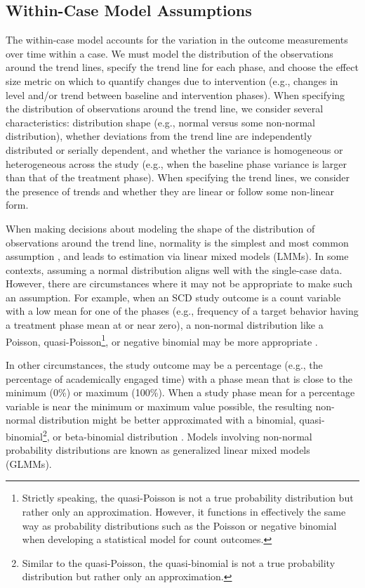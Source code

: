 \documentclass[
]{book}
\begin{document}
\hypertarget{within-case-model-assumptions}{%
\subsection{Within-Case Model Assumptions}\label{within-case-model-assumptions}}

The within-case model accounts for the variation in the outcome measurements over time within a case.
We must model the distribution of the observations around the trend lines, specify the trend line for each phase, and choose the effect size metric on which to quantify changes due to intervention (e.g., changes in level and/or trend between baseline and intervention phases).
When specifying the distribution of observations around the trend line, we consider several characteristics: distribution shape (e.g., normal versus some non-normal distribution), whether deviations from the trend line are independently distributed or serially dependent, and whether the variance is homogeneous or heterogeneous across the study (e.g., when the baseline phase variance is larger than that of the treatment phase).
When specifying the trend lines, we consider the presence of trends and whether they are linear or follow some non-linear form.

When making decisions about modeling the shape of the distribution of observations around the trend line, normality is the simplest and most common assumption \citep[e.g.,][]{Declercq2019, Moeyaert_Ferron_Beretvas_VandenNoortgate_2014, van2003combining}, and leads to estimation via linear mixed models (LMMs).
In some contexts, assuming a normal distribution aligns well with the single-case data.
However, there are circumstances where it may not be appropriate to make such an assumption.
For example, when an SCD study outcome is a count variable with a low mean for one of the phases (e.g., frequency of a target behavior having a treatment phase mean at or near zero), a non-normal distribution like a Poisson, quasi-Poisson\footnote{Strictly speaking, the quasi-Poisson is not a true probability distribution but rather only an approximation. However, it functions in effectively the same way as probability distributions such as the Poisson or negative binomial when developing a statistical model for count outcomes.}, or negative binomial may be more appropriate \citep[e.g.,][]{Declercq2019, Li_Luo_Baek_Thompson_Lam_2023, Shadish_Kyse_Rindskopf_2013}.

In other circumstances, the study outcome may be a percentage (e.g., the percentage of academically engaged time) with a phase mean that is close to the minimum (0\%) or maximum (100\%).
When a study phase mean for a percentage variable is near the minimum or maximum value possible, the resulting non-normal distribution might be better approximated with a binomial, quasi-binomial\footnote{Similar to the quasi-Poisson, the quasi-binomial is not a true probability distribution but rather only an approximation.}, or beta-binomial distribution \citep{Li_Luo_Baek_Thompson_Lam_2023, Shadish_Kyse_Rindskopf_2013}.
Models involving non-normal probability distributions are known as generalized linear mixed models (GLMMs).
\end{document}
